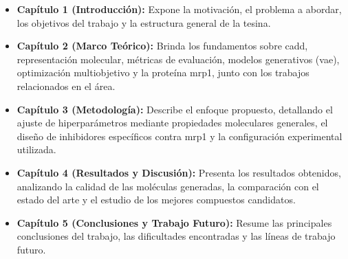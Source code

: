 \begin{itemize}
    \item \textbf{Capítulo 1 (Introducción):} Expone la motivación, el problema a abordar, los objetivos del trabajo y la estructura general de la tesina.
    \item \textbf{Capítulo 2 (Marco Teórico):} Brinda los fundamentos sobre \gls{cadd}, representación molecular, métricas de evaluación, modelos generativos (\gls{vae}), optimización multiobjetivo y la proteína \gls{mrp1}, junto con los trabajos relacionados en el área.
    \item \textbf{Capítulo 3 (Metodología):} Describe el enfoque propuesto, detallando el ajuste de hiperparámetros mediante propiedades moleculares generales, el diseño de inhibidores específicos contra \gls{mrp1} y la configuración experimental utilizada.
    \item \textbf{Capítulo 4 (Resultados y Discusión):} Presenta los resultados obtenidos, analizando la calidad de las moléculas generadas, la comparación con el estado del arte y el estudio de los mejores compuestos candidatos.
    \item \textbf{Capítulo 5 (Conclusiones y Trabajo Futuro):} Resume las principales conclusiones del trabajo, las dificultades encontradas y las líneas de trabajo futuro.
\end{itemize}
